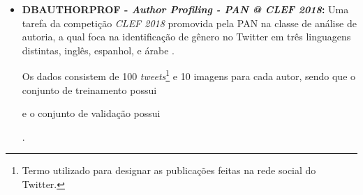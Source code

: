     \begin{itemize}
        \item \textbf{DB\underscore{}AUTHORPROF - \textit{Author Profiling - PAN @ CLEF 2018}:} Uma tarefa da competição \textit{CLEF 2018} promovida pela PAN na classe de análise de autoria, a qual foca na identificação de gênero no Twitter em três linguagens distintas, inglês, espanhol, e árabe \cite{PAN_APCLEF_2018}.
        
        Os dados consistem de 100 \textit{tweets}\footnote{Termo utilizado para designar as publicações feitas na rede social do Twitter.} e 10 imagens para cada autor, sendo que o conjunto de treinamento possui 
        e o conjunto de validação possui
        \cite{rangel2018overview}.
        

\end{itemize}
